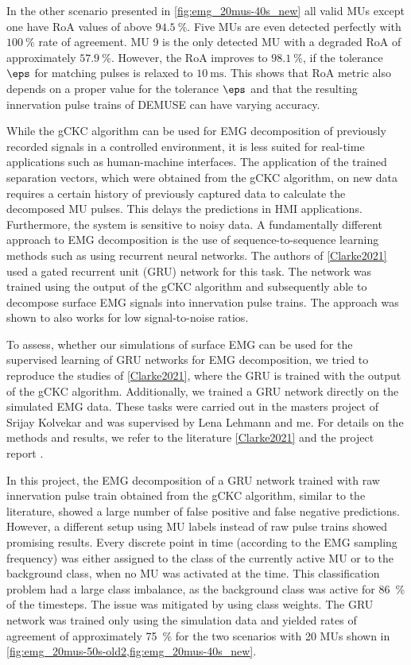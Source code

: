 In the other scenario presented in \cref{fig:emg_20mus-40s_new} all valid MUs except one have RoA values of above $\SI{94.5}{\percent}$. Five MUs are even detected perfectly with $\SI{100}{\percent}$ rate of agreement. MU 9 is the only detected MU with a degraded RoA of approximately $\SI{57.9}{\percent}$. However, the RoA improves to $\SI{98.1}{\percent}$, if the tolerance $\eps$ for matching pulses is relaxed to $\SI{10}{\ms}$. This shows that RoA metric also depends on a proper value for the tolerance $\eps$ and that the resulting innervation pulse trains of DEMUSE can have varying accuracy.
 
 
While the gCKC algorithm can be used for EMG decomposition of previously recorded signals in a controlled environment, it is less suited for real-time applications such as human-machine interfaces. The application of the trained separation vectors, which were obtained from the gCKC algorithm, on new data requires a certain history of previously captured data to calculate the decomposed MU pulses. This delays the predictions in HMI applications. Furthermore, the system is sensitive to noisy data. A fundamentally different approach to EMG decomposition is the use of sequence-to-sequence learning methods such as using recurrent neural networks. The authors of \cref{Clarke2021} used a gated recurrent unit (GRU) network for this task. The network was trained using the output of the gCKC algorithm and subsequently able to decompose surface EMG signals into innervation pulse trains. The approach was shown to also works for low signal-to-noise ratios.

To assess, whether our simulations of surface EMG can be used for the supervised learning of GRU networks for EMG decomposition, we tried to reproduce the studies of \cref{Clarke2021}, where the GRU is trained with the output of the gCKC algorithm. Additionally, we trained a GRU network directly on the simulated EMG data. These tasks were carried out in the masters project of Srijay Kolvekar and was supervised by Lena Lehmann and me. For details on the methods and results, we refer to the literature \cref{Clarke2021} and the project report \cite{Srijay}.

In this project, the EMG decomposition of a GRU network trained with raw innervation pulse train obtained from the gCKC algorithm, similar to the literature, showed a large number of false positive and false negative predictions.
However, a different setup using MU labels instead of raw pulse trains showed promising results. 
Every discrete point in time (according to the EMG sampling frequency) was either assigned to the class of the currently active MU or to the background class, when no MU was activated at the time. This classification problem had a large class imbalance, as the background class was active for \SI{86}{\percent} of the timesteps. The issue was mitigated by using class weights. The GRU network was trained only using the simulation data and yielded rates of agreement of approximately \SI{75}{\percent} for the two scenarios with 20 MUs shown in \cref{fig:emg_20mus-50s-old2,fig:emg_20mus-40s_new}. 

